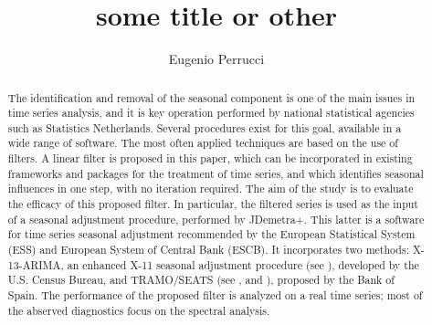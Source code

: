 \documentclass[english,blauw]{cbsdiscussionpaper}
\title{some title or other}
\author{Eugenio Perrucci}
\begin{document}
\maketitle

\tableofcontents
\clearpage

\begin{abstract}
The identification and removal of the seasonal component is one of the main issues in time series analysis, and it is key operation performed by national statistical agencies such as Statistics Netherlands. Several procedures exist for this goal, available in a wide range of software. The most often applied techniques are based on the use of filters.  A linear filter is proposed in this paper, which can be incorporated in existing frameworks and packages for the treatment of time series, and which identifies seasonal influences in one step, with no iteration required. The aim of the study is to evaluate the efficacy of this proposed filter. In particular, the filtered series is used as the input of a seasonal adjustment procedure, performed by JDemetra+. This latter is a software for time series seasonal adjustment recommended by the European Statistical System (ESS) and European System of Central Bank (ESCB). It incorporates two methods: X-13-ARIMA, an enhanced X-11 seasonal adjustment procedure (see \citep{can1980}), developed by the U.S. Census Bureau, and TRAMO/SEATS (see \citep{margo1997}, and \citep{marsa2000}), proposed by the Bank of Spain. The performance of the proposed filter is analyzed on a real time series; most of the abserved diagnostics focus on the spectral analysis.
\end{abstract}
\end{document}
